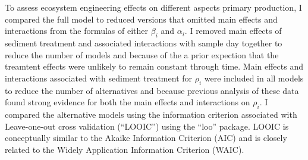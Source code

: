 To assess ecosystem engineering effects on different aspects primary production, 
I compared the full model to reduced versions 
that omitted main effects and interactions from the formulas 
of either $\beta_i$ and $\alpha_i$.
I removed main effects of sediment treatment and associated interactions with sample day 
together to reduce the number of models and because of the a prior expection that 
the treamtent effects were unlikely to remain constant through time.
Main effects and interactions associated with sediment treatment for $\rho_i$
were included in all models to reduce the number of alternatives and because 
previous analysis of these data 
found strong evidence for both the main effects and interactions on $\rho_i$.
I compared the alternative models using the information criterion associated 
with Leave-one-out cross validation (``LOOIC'') using the ``loo'' package.
LOOIC is conceptually similar to the  Akaike Information Criterion (AIC) 
and is closely related to the Widely Application Information Criterion (WAIC).
